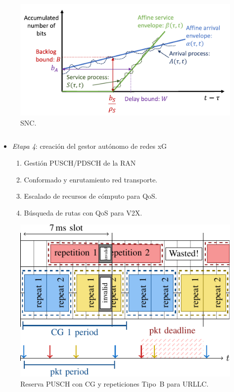 \documentclass[xcolor=table,xcolor=x11names]{beamer}
\begin{document}
\begin{frame}{\subsecname}
\begin{columns}[T]
\begin{column}{.48\textwidth}
            \vspace{2em}


            \begin{figure}[t]
                \centering
                \includegraphics[width=.8\textwidth]{figures/snc.pdf}
                \vspace{-.5em}
                \caption{SNC.}
            \end{figure}
        \end{column}
    \end{columns}
\end{frame}




\begin{frame}{\subsecname}
    \begin{itemize}
        \item \emph{Etapa 4}: creación del gestor autónomo de redes xG
            \begin{enumerate}
                \item Gestión PUSCH/PDSCH de la RAN
                \item Conformado y enrutamiento
                    red transporte.
                \item Escalado de recursos de cómputo para QoS.
                \item Búsqueda de rutas con QoS para V2X.
            \end{enumerate}
    \end{itemize}



\begin{figure}
    \centering
    \includegraphics[width=.4\textwidth]{figures/configured-grant-repetitions.pdf}
    \caption{Reserva PUSCH con CG y repeticiones Tipo~B
    para URLLC.}
\end{figure}
\end{frame}
\end{document}
